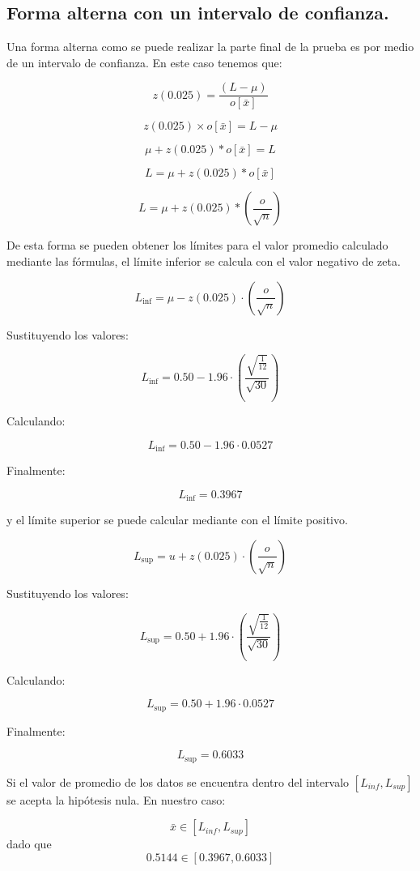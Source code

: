 \subsection{Forma alterna con un intervalo de confianza.}
 Una forma alterna como se puede realizar la parte final de la prueba es por medio de un intervalo de confianza. En este caso tenemos que:

 $$z(0.025)  =  \frac{(L - \mu)}{ o[\bar{x}]} $$

 $$z(0.025) \times  o[\bar{x}]  =  L - \mu$$

 $$\mu  +  z(0.025)*o[\bar{x}] = L$$

  $$L = \mu  +  z(0.025)*o[\bar{x}] $$

  $$L = \mu + z(0.025)*(\frac{o}{\sqrt{n}})$$

De esta forma se pueden obtener los límites para el valor promedio calculado mediante las fórmulas, el límite inferior se calcula con el valor negativo de zeta.

\[
L_{\text{inf}} = \mu - z(0.025) \cdot \left( \frac{o}{\sqrt{n}} \right)
\]

Sustituyendo los valores:

\[
L_{\text{inf}} = 0.50 - 1.96 \cdot \left( \frac{\sqrt{\frac{1}{12}}}{\sqrt{30}} \right)
\]

Calculando:

\[
L_{\text{inf}} = 0.50 - 1.96 \cdot 0.0527
\]

Finalmente:

\[
L_{\text{inf}} = 0.3967
\]

y el límite superior se puede calcular mediante con el límite positivo.

\[
L_{\text{sup}} = u + z(0.025) \cdot \left( \frac{o}{\sqrt{n}} \right)
\]

Sustituyendo los valores:

\[
L_{\text{sup}} = 0.50 + 1.96 \cdot \left( \frac{\sqrt{\frac{1}{12}}}{\sqrt{30}} \right)
\]

Calculando:

\[
L_{\text{sup}} = 0.50 + 1.96 \cdot 0.0527
\]

Finalmente:

\[
L_{\text{sup}} = 0.6033
\]

Si el valor de promedio de los datos se encuentra dentro del intervalo $[L_{inf}, L_{sup}]$ se acepta la hipótesis nula. En nuestro caso:

$$\bar{x} \in [L_{inf}, L_{sup}]$$ dado que $$0.5144  \in [0.3967 , 0.6033]$$

